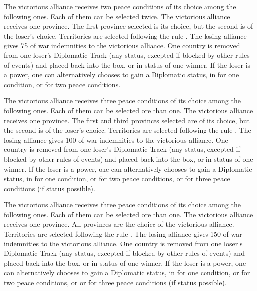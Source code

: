 \bparag The victorious alliance receives two peace conditions of its choice
among the following ones. Each of them can be selected twice.
 The victorious alliance receives one province.
The first province selected is its choice, but the second is of the loser's
choice.  Territories are selected following the rule
.
\bparag[Indemnities]
The losing alliance gives 75 \ducats of war indemnities to the victorious
alliance.
One country is removed from one loser's Diplomatic Track (any status, excepted
if blocked by other rules of events) and placed back into the \Neutral box, or
in \MR status of one winner.  If the loser is a \MIN power, one can
alternatively chooses to gain a Diplomatic status, in \MR for one condition,
or \AM for two peace conditions.

\bparag The victorious alliance receives three peace conditions of its choice
among the following ones. Each of them can be selected ore than one.
 The victorious alliance receives one province.
The first and third provinces selected are of its choice, but the second is of
the loser's choice.  Territories are selected following the rule
.
\bparag[Indemnities]
The losing alliance gives 100 \ducats of war indemnities to the victorious
alliance.
One country is removed from one loser's Diplomatic Track (any status, excepted
if blocked by other rules of events) and placed back into the \Neutral box, or
in \MR status of one winner.  If the loser is a \MIN power, one can
alternatively chooses to gain a Diplomatic status, in \MR for one condition,
or \AM for two peace conditions, or \VASSAL for three peace conditions (if
status possible).

\bparag The victorious alliance receives three peace conditions of its choice
among the following ones. Each of them can be selected ore than one.
 The victorious alliance receives one province.
All provinces are the choice of the victorious alliance.  Territories are
selected following the rule .
\bparag[Indemnities]
The losing alliance gives 150 \ducats of war indemnities to the victorious
alliance.
One country is removed from one loser's Diplomatic Track (any status, excepted
if blocked by other rules of events) and placed back into the \Neutral box, or
in \MR status of one winner.  If the loser is a \MIN power, one can
alternatively chooses to gain a Diplomatic status, in \MR for one condition,
or \AM for two peace conditions, or \VASSAL or \ANNEXION for three peace
conditions (if status possible).



